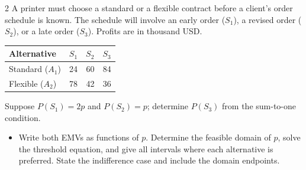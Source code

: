 \begin{multicols}{2}
A printer must choose a standard or a flexible contract before a client's order schedule is known. The schedule will involve an early order ($S_1$), a revised order ($S_2$), or a late order ($S_3$). Profits are in thousand USD.
\begin{center}\small\setlength{\tabcolsep}{4pt}
\begin{tabular}{@{}lrrr@{}}\toprule
Alternative&$S_1$&$S_2$&$S_3$\\\midrule
Standard ($A_1$)&24&60&84\\
Flexible ($A_2$)&78&42&36\\\bottomrule
\end{tabular}\end{center}
Suppose $P(S_1)=2p$ and $P(S_2)=p$; determine $P(S_3)$ from the sum-to-one condition.
\begin{itemize}\item[\textbf{(C7)}] Write both EMVs as functions of $p$. Determine the feasible domain of $p$, solve the threshold equation, and give all intervals where each alternative is preferred. State the indifference case and include the domain endpoints. \end{itemize}
\end{multicols}



